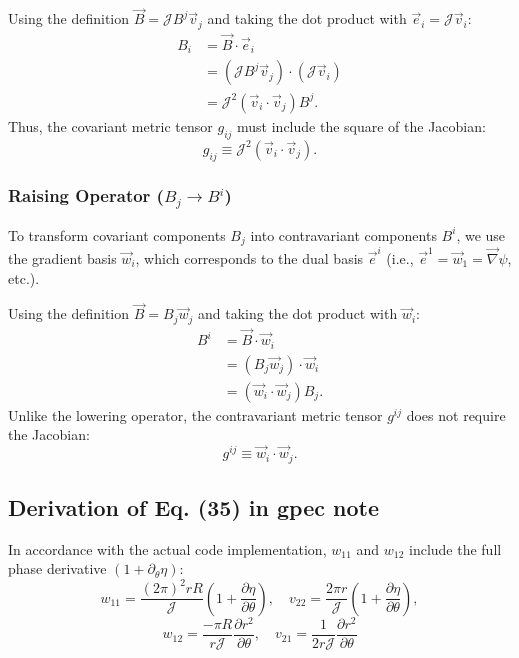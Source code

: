 \documentclass[10pt,a4paper]{article}
\numberwithin{equation}{section}
\begin{document}
Using the definition $\vec{B} = \mathcal{J} B^j \vec{v}_j$ and taking the dot product with $\vec{e}_i = \mathcal{J}\vec{v}_i$:
\begin{equation}
    \begin{aligned}
    B_i &= \vec{B} \cdot \vec{e}_i \\
        &= (\mathcal{J} B^j \vec{v}_j) \cdot (\mathcal{J} \vec{v}_i) \\
        &= \mathcal{J}^2 (\vec{v}_i \cdot \vec{v}_j) B^j.
    \end{aligned}
\end{equation}
Thus, the covariant metric tensor $g_{ij}$ must include the square of the Jacobian:
\begin{equation}
    g_{ij} \equiv \mathcal{J}^2 (\vec{v}_i \cdot \vec{v}_j).
\end{equation}

\subsubsection{Raising Operator ($B_j \to B^i$)}
To transform covariant components $B_j$ into contravariant components $B^i$, we use the gradient basis $\vec{w}_i$, which corresponds to the dual basis $\vec{e}^i$ (i.e., $\vec{e}^1 = \vec{w}_1 = \vec{\nabla}\psi$, etc.).

Using the definition $\vec{B} = B_j \vec{w}_j$ and taking the dot product with $\vec{w}_i$:
\begin{equation}
    \begin{aligned}
    B^i &= \vec{B} \cdot \vec{w}_i \\
        &= (B_j \vec{w}_j) \cdot \vec{w}_i \\
        &= (\vec{w}_i \cdot \vec{w}_j) B_j.
    \end{aligned}
\end{equation}
Unlike the lowering operator, the contravariant metric tensor $g^{ij}$ does not require the Jacobian:
\begin{equation}
    g^{ij} \equiv \vec{w}_i \cdot \vec{w}_j.
\end{equation}

\subsection{Derivation of Eq. (35) in gpec note}

In accordance with the actual code implementation, $w_{11}$ and $w_{12}$ include the full
phase derivative $(1 + \partial_\theta\eta)$:
\[
w_{11} = \frac{(2\pi)^2 r R}{\mathcal{J}} \left(1 + \frac{\partial \eta}{\partial \theta}\right),
\quad
v_{22} = \frac{2 \pi r}{\mathcal{J}} \left(1 + \frac{\partial \eta}{\partial \theta}\right),
\]
\[
w_{12} = \frac{-\pi R}{r \mathcal{J}} \frac{\partial r^2}{\partial \theta},
\quad
v_{21} = \frac{1}{2r \mathcal{J}} \frac{\partial r^2}{\partial \theta}
\]
\end{document}
